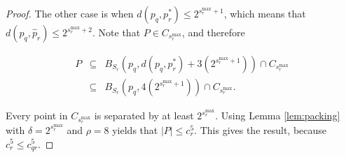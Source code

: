 \begin{proof}


The other case is when $d(p_q, p_r^*) \le 2^{s_r^{\max} + 1}$, which means that
$d(p_q, \hat{p}_r) \le 2^{s_r^{\max} + 2}$. %
Note that $P \in C_{s_r^{\max}}$, and therefore

\begin{eqnarray}
P &\subseteq& B_{S_r}(p_q, d(p_q, p_r^*) + 3(2^{s_r^{\max} + 1})) \cap
C_{s_r^{\max}} \\
 &\subseteq& B_{S_r}(p_q, 4(2^{s_r^{\max} + 1})) \cap C_{s_r^{\max}}.
\end{eqnarray}

Every point in $C_{s_r^{\max}}$ is separated by at least $2^{s_r^{\max}}$.
Using Lemma \ref{lem:packing} with $\delta = 2^{s_r^{\max}}$ and $\rho = 8$
yields that $|P| \le c_r^5$.  This gives the result, because $c_r^5 \le
c_{qr}^5$.
\end{proof}




%

